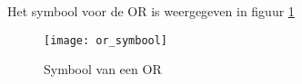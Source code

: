 Het symbool voor de OR is weergegeven in figuur \ref{symbool:or}

\begin{figure}[h]
\texttt{[image: or\_symbool]}
\centering
\caption{Symbool van een OR}
\label{symbool:or}
\end{figure}

